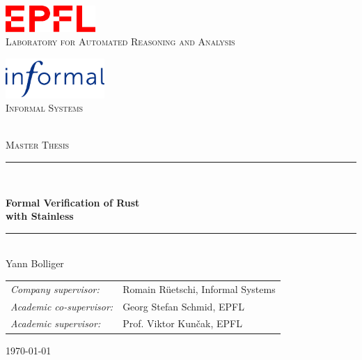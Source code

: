 \thispagestyle{empty}
\begin{center}

\vspace{4cm}
\begin{minipage}[b]{.4\textwidth}
  \begin{center}
    \includegraphics[height=10mm]{img/epfl-logo.pdf}\\
    \vspace*{3mm}
    \textsc{Laboratory for Automated Reasoning and Analysis}
  \end{center}
\end{minipage}
\begin{minipage}[b]{.4\textwidth}
  \begin{center}
    \includegraphics[height=15mm]{img/informal-logo.pdf}\\
    \textsc{Informal Systems}\\~
  \end{center}
\end{minipage}

\vspace{4cm}
{\Large \textsc{Master Thesis}}
\vspace*{1cm}

\rule{.9\linewidth}{.6pt}\\[0.4cm]
{\huge \bfseries Formal Verification of Rust \\ with Stainless \par}\vspace{0.4cm}
\rule{.9\linewidth}{.6pt}\\[1.5cm]

\vspace*{1cm}
{\Large Yann Bolliger}
\vspace*{1cm}

\begin{tabular}{ll}
\textit{Company supervisor:}     & Romain Rüetschi, Informal Systems \\
\textit{Academic co-supervisor:} & Georg Stefan Schmid, EPFL \\
\textit{Academic supervisor:}    & Prof. Viktor Kun\v{c}ak, EPFL
\end{tabular}

\vspace*{3cm}
\today\\[4cm] %

\end{center}
\clearpage


